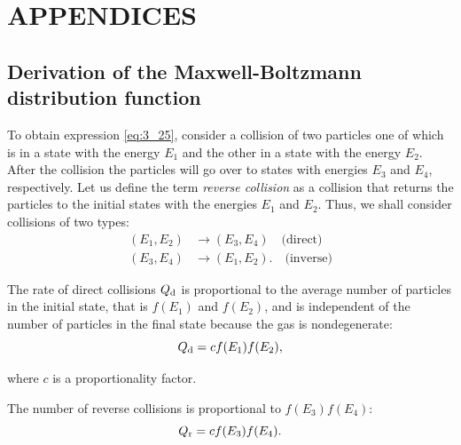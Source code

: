 
\appendix

\chapter*{APPENDICES}\label{chap:A}
\renewcommand{\thechapter}{A}
\setcounter{section}{0}
\renewcommand{\thesection}{\thechapter.\arabic{section}}
\setcounter{equation}{0}
\renewcommand{\theequation}{\thechapter.\arabic{equation}}
\setcounter{figure}{0}
\renewcommand{\thefigure}{\thechapter.\arabic{figure}}
\setcounter{table}{0}
\renewcommand{\thetable}{\thechapter.\arabic{table}}

\section{Derivation of the Maxwell-Boltzmann distribution function}\label{sec:A_I}

To obtain expression \eqref{eq:3_25}, consider a collision of two particles one of which is in a state with the energy $E_1$ and the other in a state with the energy $E_2$. After the collision the particles will go over to states with energies $E_3$ and $E_4$, respectively. Let us define the term \textit{reverse collision} as a collision that returns the particles to the initial states with the energies $E_1$ and $E_2$. Thus, we shall consider collisions of two types:
\begin{align*}
    (E_1, E_2) &\to (E_3, E_4)\quad\text{(direct)}\\
    (E_3, E_4) &\to (E_1, E_2).\quad\text{(inverse)}
\end{align*}

The rate of direct collisions $Q_{\text{d}}$ is proportional to the average number of particles in the initial state, that is $f(E_1)$ and $f(E_2)$, and is independent of the number of particles in the final state because the gas is nondegenerate:
\begin{equation}\label{eq:A_1}
    Q_{\text{d}} = c f(E_1) f(E_2),
\end{equation}

\noindent
where $c$ is a proportionality factor.

The number of reverse collisions is proportional to $f(E_3) f(E_4)$:
\begin{equation}\label{eq:A_2}
    Q_{\text{r}} = c f(E_3) f(E_4).
\end{equation}

